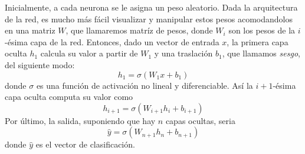 Inicialmente, a cada neurona se le asigna un peso aleatorio. Dada la arquitectura
de la red, es mucho más fácil visualizar y manipular estos pesos acomodandolos en
una matriz $W$, que llamaremos matríz de pesos, donde $W_i$ son los pesos de la
$i$-ésima capa de la red. Entonces, dado un vector de entrada $x$, la primera capa
oculta $h_1$ calcula su valor a partir de $W_1$ y una traslación $b_1$, que llamamos
\textit{sesgo}, del siguiente modo:
\begin{equation}
  h_1 = \sigma(W_1x + b_1)
\end{equation}
donde $\sigma$ es una función de activación no lineal y diferenciable. Así la
$i+1$-ésima capa oculta computa su valor como
\begin{equation}
  h_{i+1} = \sigma(W_{i+1}h_i + b_{i+1})
\end{equation}
Por último, la salida, suponiendo que hay $n$ capas ocultas, seria
\begin{equation}
  \hat{y} = \sigma{(W_{n+1}h_n + b_{n+1})}
\end{equation}
donde $\hat{y}$ es el vector de clasificación.
